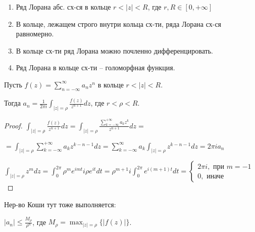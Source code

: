 \begin{properties}
    \begin{enumerate}
        \item Ряд Лорана абс. сх-ся в кольце $r < |z| < R$, где $r, R \in [0, +\infty]$
        \item В кольце, лежащем строго внутри кольца сх-ти, ряда Лорана сх-ся равномерно.
        \item В кольце сх-ти ряд Лорана можно почленно дифференцировать. 
        \item Ряд Лорана в кольце сх-ти -- голоморфная функция.
    \end{enumerate}
\end{properties}

\begin{theorem}
    Пусть $f(z) = \sum_{n=-\infty}^{\infty} a_n z^n$ в кольце $r < |z| < R$.

    Тогда $a_n = \frac{1}{2 \pi i} \int_{|z| = \rho} {\frac{f(z)}{z^{n+1}} dz}$, где $r < \rho < R$.
\end{theorem}

\begin{proof}
    $\int_{|z| = \rho} { \frac{f(z)}{z^{n+1}} dz } = \int_{|z| = \rho} { \frac{\sum_{k = -\infty}^{+\infty} a_k z^k}{z^{n+1}} dz } =$
    
    $= \int_{|z| = \rho} { \sum_{k=-\infty}^{+\infty} a_k z^{k - n - 1} dz } = \sum_{k = -\infty}^{\infty} a_k \int_{|z| = \rho} { z^{k-n-1} dz } = 2\pi i a_n$

    $\int_{|z| = \rho} { z^m dz } = \int_{0}^{2\pi} { \rho^m e^{i m t} i \rho e^{i t} dt } = \rho^{m+1} i \int_{0}^{2\pi} { e^{i (m+1) t} dt } = \begin{cases}
        2 \pi i, \text{ при } m = -1 \\
        0, \text{ иначе}
    \end{cases}$
\end{proof}


\begin{remark}
    Нер-во Коши тут тоже выполняется:

    $|a_n| \leq \frac{M_{\rho}}{\rho^n}$, где $M_{\rho} = \max_{|z| = \rho}\{ |f(z)| \}$.
\end{remark}

